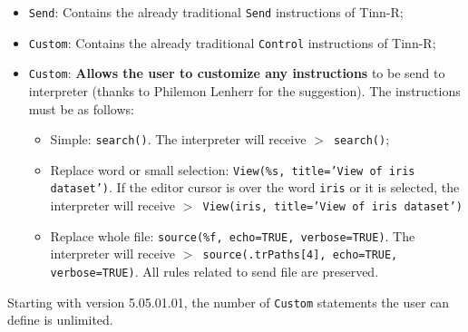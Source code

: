 \begin{itemize}
\item \texttt{Send}: Contains the already traditional \texttt{Send} instructions of Tinn-R;
\item \texttt{Custom}: Contains the already traditional \texttt{Control} instructions of Tinn-R;
\item \texttt{Custom}: \textbf{Allows the user to customize any instructions} to be send to \RR{} interpreter (thanks to Philemon Lenherr for the suggestion). The instructions must be as follows:
 \begin{itemize}
 \item Simple: \texttt{search()}. The \RR{} interpreter will receive \texttt{$>$ search()};
 \item Replace word or small selection: \texttt{View(\%s, title='View of iris dataset')}.
   If the editor cursor is over the word \texttt{iris} or it is selected,
   the \RR{} interpreter will receive \texttt{$>$ View(iris, title='View of iris dataset')}
 \item Replace whole file: \texttt{source(\%f, echo=TRUE, verbose=TRUE)}.
   The \RR{} interpreter will receive \texttt{$>$ source(.trPaths[4], echo=TRUE, verbose=TRUE)}.
   All rules related to send file are preserved.
 \end{itemize}
\end{itemize}

Starting with version 5.05.01.01, the number of \texttt{Custom} statements the user can define is unlimited.
